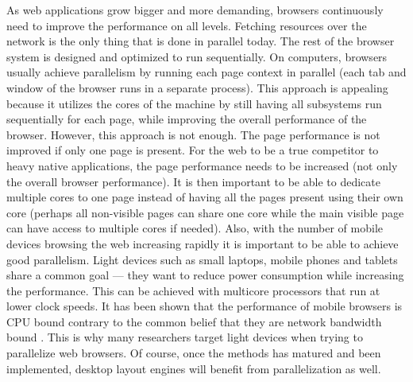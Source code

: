 \documentclass[a4paper,11pt]{kth-mag}
\begin{document}
        As \gls{web} applications grow bigger and more demanding, \glspl{browser} continuously need to improve the performance on all levels.
        Fetching resources over the network is the only thing that is done in parallel today.
        The rest of the \gls{browser} system is designed and optimized to run sequentially.
        On computers, \glspl{browser} usually achieve parallelism by running each page context in parallel (each tab and window of the \gls{browser} runs in a separate process).
        This approach is appealing because it utilizes the cores of the machine by still having all subsystems run sequentially for each page, while improving the overall performance of the \gls{browser}.
        However, this approach is not enough.
        The page performance is not improved if only one page is present.
        For the \gls{web} to be a true competitor to heavy native applications, the page performance needs to be increased (not only the overall \gls{browser} performance).
        It is then important to be able to dedicate multiple cores to one page instead of having all the pages present using their own core (perhaps all non-visible pages can share one core while the main visible page can have access to multiple cores if needed).
        Also, with the number of mobile devices browsing the \gls{web} increasing rapidly it is important to be able to achieve good parallelism.
        Light devices such as small laptops, mobile phones and tablets share a common goal --- they want to reduce power consumption while increasing the performance.
        This can be achieved with multicore processors that run at lower clock speeds.
        It has been shown that the performance of mobile \glspl{browser} is \gls{CPU} bound contrary to the common belief that they are network bandwidth bound \cite{parallelizing_the_web_browser}.
        This is why many researchers target light devices when trying to parallelize \gls{web} \glspl{browser}.
        Of course, once the methods has matured and been implemented, desktop layout engines will benefit from parallelization as well.
\end{document}
